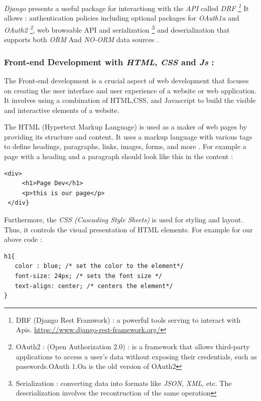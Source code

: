 \documentclass[12pt,a4paper]{report}
\begin{document}
\textit{Django} presents a useful package for interactiong with the \textit{API} called \textit{DRF \footnote{DRF (Django Rest Framwork) : a powerful tools serving to interact with Apis. \url{https://www.django-rest-framework.org/}}} It allows : authentication policies including optional packages for \textit{OAuth1a} and \textit{OAuth2 \footnote{OAuth2 :   (Open Authorization 2.0) : is a framework that allows third-party applications to access a user's data without exposing their credentials, such as passwords.OAuth 1.Oa is the old version of OAuth2  }}, web browsable API  and serialization \footnote{Serialization : converting data into formats like \textit{JSON}, \textit{XML}, etc. The deserialization involves the recontruction of the same operation} and deserialization that supports both \textit{ORM} And \textit{NO-ORM} data sources \cite{nader2023django}.
 
\subsubsection{Front-end Development with \textit{HTML}, \textit{CSS} and \textit{Js} :} 
The Front-end development is a crucial aspect of web development that focuses on creating the user interface and user experience of a website or web application. It involves using a combination of HTML,CSS, and Javascript to build the visible and interactive elements of a website. 

The HTML (Hypertext Markup Language) is used as a maker of web pages by providing its structure and content. It uses a markup language with various tags to define headings, paragraphs, links, images, forms, and more \cite{stark2010building}. For example a page with a heading and a paragraph should look like this in the content :
\begin{lstlisting}[style=stylepython]
 <div>
     <h1>Page Dev</h1>
     <p>this is our page</p>
 </div}
\end{lstlisting}

Furthermore, the \textit{CSS (Cascading Style Sheets)} is used for styling and layout. Thus, it controls the visual presentation of HTML elements. For example for our above code : \newline
\begin{lstlisting}[style=stylepython]
h1{
   color : blue; /* set the color to the element*/
   font-size: 24px; /* sets the font size */
   text-align: center; /* centers the element*/
}
\end{lstlisting} 
\end{document}
